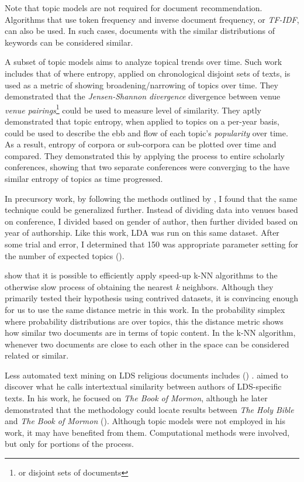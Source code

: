 Note that topic models are not required for document recommendation. Algorithms that use token frequency and inverse document frequency, or \emph{TF-IDF}, can also be used. In such cases, documents with the similar distributions of keywords can be considered similar.

A subset of topic models aims to analyze topical trends over time. Such work includes that of \cite{hall-jurafsky-manning:2008:EMNLP} where entropy, applied on chronological disjoint sets of texts, is used as a metric of showing broadening/narrowing of topics over time. They demonstrated that the \emph{Jensen-Shannon divergence} divergence between venue \emph{venue pairings}\footnote{or disjoint sets of documents} could be used to measure level of similarity. They aptly demonstrated that topic entropy, when applied to topics on a per-year basis, could be used to describe the ebb and flow of each topic’s \emph{popularity} over time. As a result, entropy of corpora or sub-corpora can be plotted over time and compared. They demonstrated this by applying the process to entire scholarly conferences, showing that two separate conferences were converging to the have similar entropy of topics as time progressed.

In precursory work, by following the methods outlined by \cite{hall-jurafsky-manning:2008:EMNLP}, I found that the same technique could be generalized further. Instead of dividing data into venues based on conference, I divided based on gender of author, then further divided based on year of authorship. Like this work, LDA was run on this same dataset. After some trial and error, I determined that 150 was appropriate parameter setting for the number of expected topics (\citealp{bean5-LDA-ToT}).%

\cite{Krstovski2013efficient} %
show that it is possible to efficiently apply speed-up k-NN algorithms to the otherwise slow process of obtaining the nearest \emph{k} neighbors. Although they primarily tested their hypothesis using contrived datasets, it is convincing enough for us to use the same distance metric in this work. In the probability simplex where probability distributions are over topics, this the distance metric shows how similar two documents are in terms of topic content. In the k-NN algorithm, whenever two documents are close to each other in the space can be considered related or similar.

Less automated text mining on LDS religious documents includes (\citealp{hilton:2008:abinadi}) %
. \citeauthor{hilton:2008:abinadi} aimed to discover what he calls intertextual similarity between authors of LDS-specific texts. In his work, he focused on \emph{The Book of Mormon}, although he later demonstrated that the methodology could locate results between \emph{The Holy Bible} and \emph{The Book of Mormon} (\citealp{hilton:2013:psalms}). Although topic models were not employed in his work, it may have benefited from them. Computational methods were involved, but only for portions of the process.

